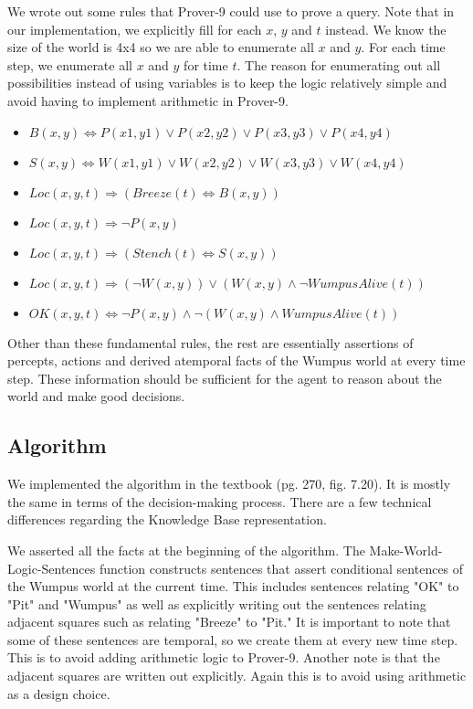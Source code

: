 We wrote out some rules that Prover-9 could use to prove a query. Note that in our implementation, we explicitly fill for each $x$, $y$ and $t$ instead. We know the size of the world is 4x4 so we are able to enumerate all $x$ and $y$. For each time step, we enumerate all $x$ and $y$ for time $t$. The reason for enumerating out all possibilities instead of using variables is to keep the logic relatively simple and avoid having to implement arithmetic in Prover-9.

\begin{itemize}
	\item $B(x,y) \Leftrightarrow P(x1,y1) \vee P(x2,y2) \vee P(x3,y3) \vee P(x4,y4)$
        \item $S(x,y) \Leftrightarrow W(x1,y1) \vee W(x2,y2) \vee W(x3,y3) \vee W(x4,y4)$
        \item $Loc(x,y,t) \Rightarrow (Breeze(t) \Leftrightarrow B(x,y))$
        \item $Loc(x,y,t) \Rightarrow \neg P(x,y)$
        \item $Loc(x,y,t) \Rightarrow (Stench(t) \Leftrightarrow S(x,y))$
        \item $Loc(x,y,t) \Rightarrow (\neg W(x,y)) \vee (W(x,y) \wedge \neg WumpusAlive(t))$
        \item $OK(x,y,t) \Leftrightarrow \neg P(x,y) \wedge \neg(W(x,y) \wedge WumpusAlive(t))$
\end{itemize}

Other than these fundamental rules, the rest are essentially assertions of percepts, actions and derived atemporal facts of the Wumpus world at every time step. These information should be sufficient for the agent to reason about the world and make good decisions.

\subsection{Algorithm}

We implemented the algorithm in the textbook (pg. 270, fig. 7.20). It is mostly the same in terms of the decision-making process. There are a few technical differences regarding the Knowledge Base representation.

We asserted all the facts at the beginning of the algorithm. The Make-World-Logic-Sentences function constructs sentences that assert conditional sentences of the Wumpus world at the current time. This includes sentences relating "OK" to "Pit" and "Wumpus" as well as explicitly writing out the sentences relating adjacent squares such as relating "Breeze" to "Pit." It is important to note that some of these sentences are temporal, so we create them at every new time step. This is to avoid adding arithmetic logic to Prover-9. Another note is that the adjacent squares are written out explicitly. Again this is to avoid using arithmetic as a design choice. 

